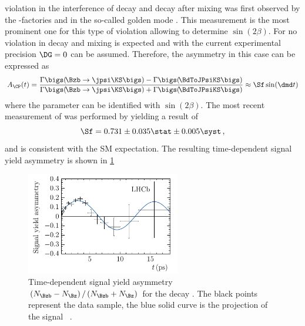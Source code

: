 \CP violation in the interference of decay and decay after mixing was first observed by the \B-factories \babar \cite{Aubert:2001nu} and \belle \cite{Abe:2001xe} in the so-called golden mode \BdToJPsiKS.
This measurement is the most prominent one for this type of \CP violation allowing to determine $\sin\!\left(2\beta\right)$.
For \BdToJPsiKS no \CP violation in decay and mixing is expected and with the current experimental precision $\DG=0$ can be assumed.
Therefore, the \CP asymmetry in this case can be expressed as
\begin{equation}
A_{\CP}(t)=\frac{\Gamma\bigs(\!\Bzb\to\jpsi\KS\bigs)-\Gamma\bigs(\!\BdToJPsiKS\bigs)}{\Gamma\bigs(\!\Bzb\to\jpsi\KS\bigs)+\Gamma\bigs(\!\BdToJPsiKS\bigs)}\approx\Sf\sin\!\left(\dmd t\right)\label{eq:CPAsymBd2JpsiKS}
\end{equation}
where the parameter \Sf can be identified with $\sin\!\left(2\beta\right)$.
The most recent measurement of \Sf was performed by \lhcb \cite{Aaij:2015vza} yielding a result of
\begin{equation}
\Sf=0.731\pm0.035\stat\pm0.005\syst\,,
\end{equation}
and is consistent with the \ac{SM} expectation. The resulting time-dependent signal yield asymmetry is shown in \cref{fig:sin2beta}
\begin{figure}[tb]
	\centering
	\includegraphics[width=0.6\textwidth]{03CPV/figs/InterferenceCPV.pdf}
	\caption{Time-dependent signal yield asymmetry $\left(N_{\Bzb}-N_{\Bz}\right)/\left(N_{\Bzb}+N_{\Bz}\right)$ for the decay \mbox{\BdToJPsiKS}.
	The black points represent the data sample, the blue solid curve is the projection of the signal \PDF~\cite{Aaij:2015vza}.}
	\label{fig:sin2beta}
\end{figure}
